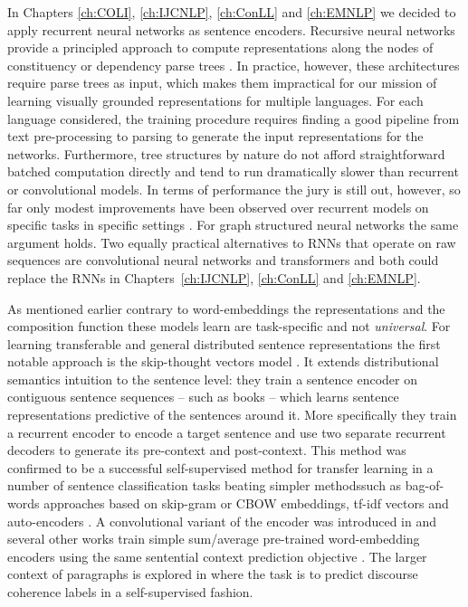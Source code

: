 In Chapters \ref{ch:COLI}, \ref{ch:IJCNLP}, \ref{ch:ConLL} and \ref{ch:EMNLP} we decided to apply
recurrent neural networks as sentence encoders.
Recursive neural networks provide a principled approach to
compute representations along the nodes of constituency
or dependency parse trees \citep{socher2013recursive,socher2014grounded,le2015compositional,kai2015treelstm}.
In practice, however, these architectures require parse trees as input,
which makes them impractical for our mission of learning visually grounded
representations for multiple languages.
For each language considered, the training procedure requires finding a good
pipeline from text pre-processing to parsing to generate the input representations
for the networks. Furthermore, tree structures by nature do not
afford straightforward batched computation directly and tend to run dramatically
slower than recurrent or convolutional models. In terms of performance the jury
is still out, however, so far only modest improvements have been observed
over recurrent models on specific tasks in specific settings
\citep{li2015tree,kai2015treelstm}. For graph structured neural networks the
same argument holds. Two equally practical alternatives to RNNs
that operate on raw sequences are convolutional neural networks
\citep{bai2018empirical} and transformers \citep{vaswani2017attention} and both could
replace the RNNs in Chapters~\ref{ch:IJCNLP}, \ref{ch:ConLL} and \ref{ch:EMNLP}.


As mentioned earlier contrary to word-embeddings the representations
and the composition function these models learn are task-specific and not \emph{universal}.
For learning transferable and general distributed sentence representations the
first notable approach is the
skip-thought vectors model \citep{kiros2015skip}.
It extends distributional semantics intuition to the sentence level:
they train a sentence encoder on contiguous sentence sequences
-- such as books -- which learns sentence representations predictive of the sentences around it.
More specifically
they train a recurrent encoder to encode a target sentence and use two separate recurrent decoders to
generate its pre-context and post-context.
This method was confirmed to be a successful self-supervised method for transfer
learning in a number of sentence
classification tasks beating simpler methodssuch as bag-of-words approaches based on skip-gram
or CBOW embeddings, tf-idf vectors and auto-encoders \citep{hill2016learning}. A convolutional
variant of the encoder was introduced in \cite{gan2016unsupervised} and several other works
train simple sum/average pre-trained word-embedding encoders using the same sentential
context prediction objective \citep{kenter2016siamese,hill2016learning}. The larger context of paragraphs is
explored in \cite{jernite2017discourse} where the task is to predict discourse coherence
labels in a self-supervised fashion.

